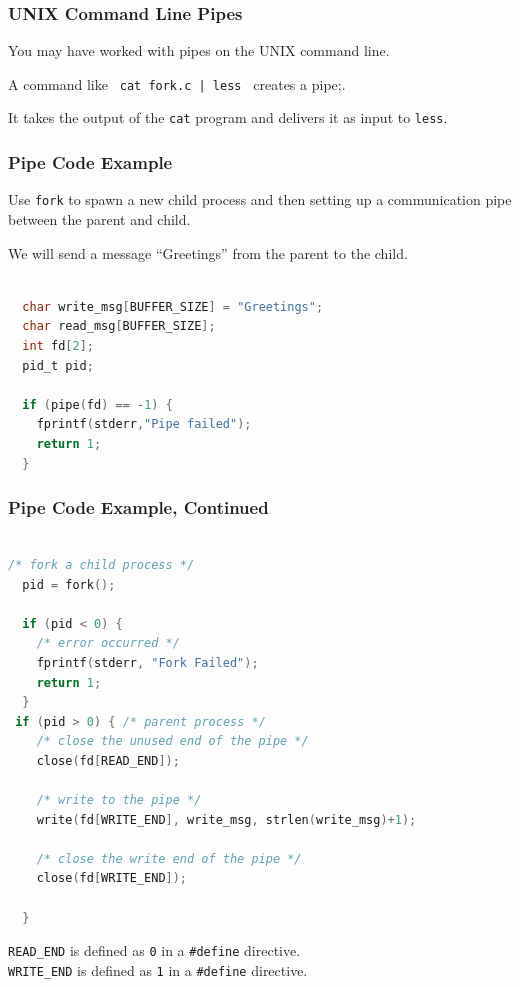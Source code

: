 \begin{frame}
\frametitle{UNIX Command Line Pipes}

You may have worked with pipes on the UNIX command line. 

A command like \texttt{ cat fork.c | less } creates a pipe;.

It takes the output of the \texttt{cat} program and delivers it as input to \texttt{less}.

\end{frame}

\begin{frame}[fragile]
\frametitle{Pipe Code Example}

Use \texttt{fork} to spawn a new child process and then setting up a communication pipe between the parent and child. 

We will send a message ``Greetings'' from the parent to the child.

\begin{lstlisting}[language=C]

  char write_msg[BUFFER_SIZE] = "Greetings"; 
  char read_msg[BUFFER_SIZE];
  int fd[2];
  pid_t pid;

  if (pipe(fd) == -1) {
    fprintf(stderr,"Pipe failed");
    return 1;
  }

\end{lstlisting}


\end{frame}

\begin{frame}[fragile]
\frametitle{Pipe Code Example, Continued}

\begin{lstlisting}[language=C]

/* fork a child process */
  pid = fork();
  
  if (pid < 0) { 
    /* error occurred */ 
    fprintf(stderr, "Fork Failed"); 
    return 1;
  }
 if (pid > 0) { /* parent process */
    /* close the unused end of the pipe */ 
    close(fd[READ_END]);
    
    /* write to the pipe */
    write(fd[WRITE_END], write_msg, strlen(write_msg)+1);
    
    /* close the write end of the pipe */
    close(fd[WRITE_END]);
    
  } 

\end{lstlisting}

\texttt{READ\_END} is defined as \texttt{0} in a \texttt{\#define} directive.\\
\texttt{WRITE\_END} is defined as \texttt{1} in a \texttt{\#define} directive.

\end{frame}

